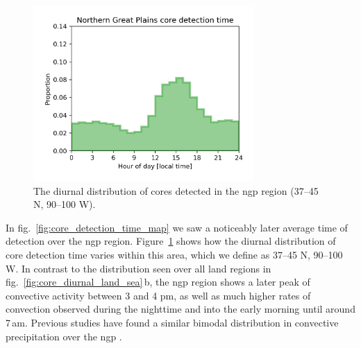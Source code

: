 \begin{figure}[tp]
    \centering
    \includegraphics[width=0.75\textwidth]{figures/chapter2_13.png}
    \caption[
    The diurnal distribution of cores detected in the \acrshort{ngp} region
    ]{
    The diurnal distribution of cores detected in the \acrshort{ngp} region (37--45\,\textdegree\,N, 90--100\,\textdegree\,W).
    }
    \label{fig:core_ngp_contrast}
\end{figure}

In fig.~\ref{fig:core_detection_time_map} we saw a noticeably later average time of detection over the \acrfull{ngp} region.
Figure~\ref{fig:core_ngp_contrast} shows how the diurnal distribution of core detection time varies within this area, which we define as 37--45\,\textdegree\,N, 90--100\,\textdegree\,W.
In contrast to the distribution seen over all land regions in fig.~\ref{fig:core_diurnal_land_sea}\,b, the \acrshort{ngp} region shows a later peak of convective activity between 3 and 4 pm, as well as much higher rates of convection observed during the nighttime and into the early morning until around 7\,am.
Previous studies have found a similar bimodal distribution in convective precipitation over the \acrshort{ngp} \citet{li_high-resolution_2021}.

